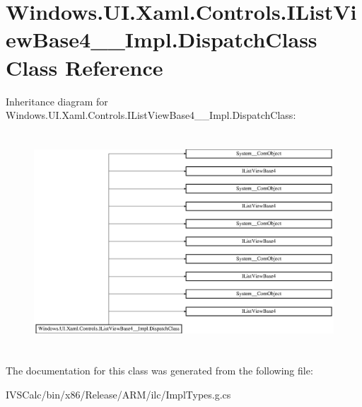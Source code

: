 \hypertarget{class_windows_1_1_u_i_1_1_xaml_1_1_controls_1_1_i_list_view_base4_____impl_1_1_dispatch_class}{}\section{Windows.\+U\+I.\+Xaml.\+Controls.\+I\+List\+View\+Base4\+\_\+\+\_\+\+Impl.\+Dispatch\+Class Class Reference}
\label{class_windows_1_1_u_i_1_1_xaml_1_1_controls_1_1_i_list_view_base4_____impl_1_1_dispatch_class}
Inheritance diagram for Windows.\+U\+I.\+Xaml.\+Controls.\+I\+List\+View\+Base4\+\_\+\+\_\+\+Impl.\+Dispatch\+Class\+:\begin{figure}[H]
\begin{center}
\leavevmode
\includegraphics[height=8.169762cm]{class_windows_1_1_u_i_1_1_xaml_1_1_controls_1_1_i_list_view_base4_____impl_1_1_dispatch_class}
\end{center}
\end{figure}


The documentation for this class was generated from the following file\+:\begin{DoxyCompactItemize}
\item 
I\+V\+S\+Calc/bin/x86/\+Release/\+A\+R\+M/ilc/Impl\+Types.\+g.\+cs\end{DoxyCompactItemize}
